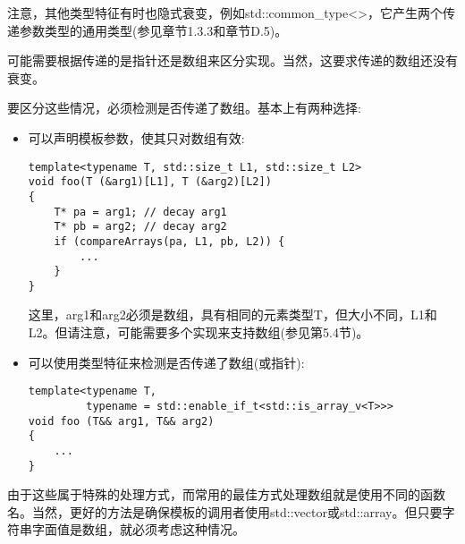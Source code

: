 注意，其他类型特征有时也隐式衰变，例如std::common\_type<>，它产生两个传递参数类型的通用类型(参见章节1.3.3和章节D.5)。


可能需要根据传递的是指针还是数组来区分实现。当然，这要求传递的数组还没有衰变。

要区分这些情况，必须检测是否传递了数组。基本上有两种选择:

\begin{itemize}
\item 
可以声明模板参数，使其只对数组有效:

\begin{lstlisting}[style=styleCXX]
template<typename T, std::size_t L1, std::size_t L2>
void foo(T (&arg1)[L1], T (&arg2)[L2])
{
	T* pa = arg1; // decay arg1
	T* pb = arg2; // decay arg2
	if (compareArrays(pa, L1, pb, L2)) {
		...
	}
}
\end{lstlisting}

这里，arg1和arg2必须是数组，具有相同的元素类型T，但大小不同，L1和L2。但请注意，可能需要多个实现来支持数组(参见第5.4节)。

\item 
可以使用类型特征来检测是否传递了数组(或指针):

\begin{lstlisting}[style=styleCXX]
template<typename T,
		 typename = std::enable_if_t<std::is_array_v<T>>>
void foo (T&& arg1, T&& arg2)
{
	...
}
\end{lstlisting}
\end{itemize}

由于这些属于特殊的处理方式，而常用的最佳方式处理数组就是使用不同的函数名。当然，更好的方法是确保模板的调用者使用std::vector或std::array。但只要字符串字面值是数组，就必须考虑这种情况。


















